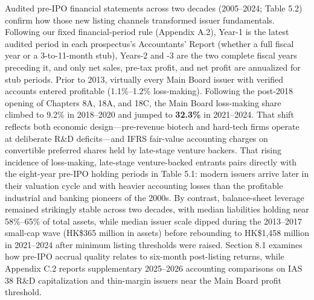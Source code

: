 \documentclass[11pt,letterpaper]{article}
\begin{document}
Audited pre-IPO financial statements across two decades (2005–2024; Table 5.2) confirm how those new listing channels transformed issuer fundamentals. Following our fixed financial-period rule (Appendix A.2), Year-1 is the latest audited period in each prospectus's Accountants' Report (whether a full fiscal year or a 3-to-11-month stub), Years-2 and -3 are the two complete fiscal years preceding it, and only net sales, pre-tax profit, and net profit are annualized for stub periods. Prior to 2013, virtually every Main Board issuer with verified accounts entered profitable (1.1\%–1.2\% loss-making). Following the post-2018 opening of Chapters 8A, 18A, and 18C, the Main Board loss-making share climbed to 9.2\% in 2018–2020 and jumped to \textbf{32.3\%} in 2021–2024. That shift reflects both economic design—pre-revenue biotech and hard-tech firms operate at deliberate R\&D deficits—and IFRS fair-value accounting charges on convertible preferred shares held by late-stage venture backers. That rising incidence of loss-making, late-stage venture-backed entrants pairs directly with the eight-year pre-IPO holding periods in Table 5.1: modern issuers arrive later in their valuation cycle and with heavier accounting losses than the profitable industrial and banking pioneers of the 2000s. By contrast, balance-sheet leverage remained strikingly stable across two decades, with median liabilities holding near 58\%–65\% of total assets, while median issuer scale dipped during the 2013–2017 small-cap wave (HK\$365 million in assets) before rebounding to HK\$1,458 million in 2021–2024 after minimum listing thresholds were raised. Section 8.1 examines how pre-IPO accrual quality relates to six-month post-listing returns, while Appendix C.2 reports supplementary 2025–2026 accounting comparisons on IAS 38 R\&D capitalization and thin-margin issuers near the Main Board profit threshold.
\end{document}
